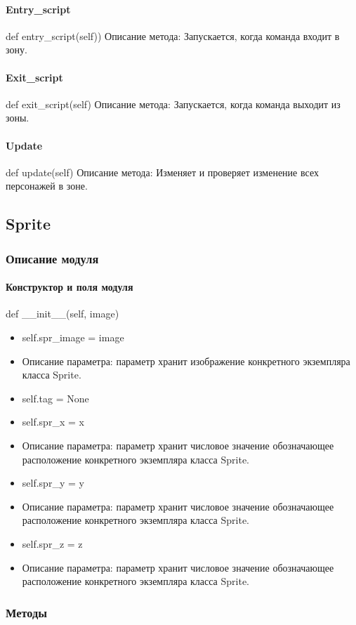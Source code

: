 \paragraph{Entry\_script}
def entry\_script(self))
Описание метода: Запускается, когда команда входит в зону.
\paragraph{Exit\_script}
def exit\_script(self)
Описание метода: Запускается, когда команда выходит из зоны.
\paragraph{Update}
def update(self)
Описание метода: Изменяет и проверяет изменение всех персонажей в зоне.

\subsection{Sprite}
\subsubsection{Описание модуля}
\paragraph{Конструктор и поля модуля}
def \_\_init\_\_(self, image)
\begin{itemize}
	\item self.spr\_image = image
	\item Описание параметра: параметр хранит изображение конкретного экземпляра класса Sprite.
	\item self.tag = None
	\item self.spr\_x = x
	\item Описание параметра: параметр хранит числовое значение обозначающее расположение конкретного экземпляра класса Sprite.
	\item self.spr\_y = y
	\item Описание параметра: параметр хранит числовое значение обозначающее расположение конкретного экземпляра класса Sprite.
	\item self.spr\_z = z
	\item Описание параметра: параметр хранит числовое значение обозначающее расположение конкретного экземпляра класса Sprite.
\end{itemize}
\subsubsection{Методы}
